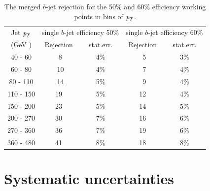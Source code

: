 \begin{table}[!hbt] %
\renewcommand{\arraystretch}{1.2}
\centering
\begin{tabular}{ | c || c | c || c | c||}
  \hline
  Jet ${\emph{p}_{T}}$ & \multicolumn{2}{c||}{single $b$-jet efficiency 50\%} & 
            \multicolumn{2}{c||}{single $b$-jet efficiency 60\%}\\ \cline{2-5}
    (GeV )  & Rejection & ~stat.err.~ & Rejection & ~stat.err.~ \\ \hline
   40 - 60 &  ~8 &  4\%  &  ~5  &  3\%    \\ 
   60 - 80 &  ~10 &  4\%  &  ~7  &  4\%    \\ 
   80 - 110&  ~14 &  5\%  &  ~9  &  4\%    \\ 
  110 - 150&  19 &  5\%  &  12  &  4\%    \\ 
  150 - 200&  23 &  5\%  &  14  &  5\%    \\ 
  200 - 270&  30 &  7\%  &  16  &  6\%    \\ 
  270 - 360&  36 &  7\%  &  19  &  6\%    \\ 
  360 - 480&  41 &  8\%  &  18  &  8\%    \\ \hline
\end{tabular}
\caption{The merged $b$-jet rejection for the 50\% and 60\% efficiency working points in bins of ${\emph{p}_{T}}$.}
\label{tb:rejection}
\end{table}







\section{Systematic uncertainties}\label{sec:gbbSystematics}

